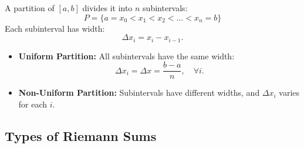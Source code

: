 \documentclass[a4paper,11pt]{article}
\begin{document}
\begin{tcolorbox}[breakable]
    A partition of $[a, b]$ divides it into $n$ subintervals:
    \[
    P = \{ a = x_0 < x_1 < x_2 < \dots < x_n = b \}
    \]
    Each subinterval has width:
    \[
    \Delta x_i = x_i - x_{i-1}.
    \]
    \begin{itemize}
        \item \textbf{Uniform Partition:} All subintervals have the same width:
        \[
        \Delta x_i = \Delta x = \frac{b-a}{n}, \quad \forall i.
        \]
        \item \textbf{Non-Uniform Partition:}  Subintervals have different widths, and \( \Delta x_i \) varies for each \( i \).
    \end{itemize}
\end{tcolorbox}



\subsection{Types of Riemann Sums}
\end{document}
